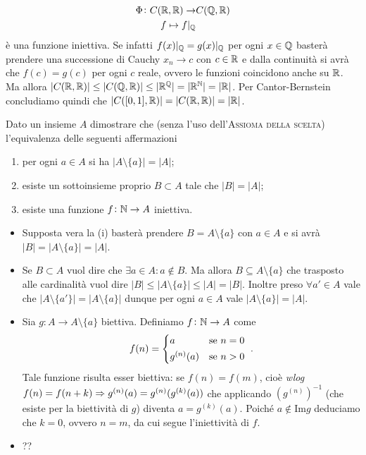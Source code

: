 \begin{enumerate}
  \begin{align*}
    \Phi \colon C(\mathbb{R}, \mathbb{R}) \to & C(\mathbb{Q}, \mathbb{R}) \\
    f \mapsto f |_{\mathbb{Q}}
  \end{align*}
  è una funzione iniettiva. Se infatti $ f(x)|_{\mathbb{Q}} = g(x)|_{\mathbb{Q}} $ per ogni $ x \in \mathbb{Q} $ basterà prendere una successione di Cauchy $ x_n \to c $ con $ c \in \mathbb{R} $ e dalla continuità si avrà che $ f(c) = g(c) $ per ogni $ c $ reale, ovvero le funzioni coincidono anche su $ \mathbb{R} $. Ma allora $ |C(\mathbb{R}, \mathbb{R})|\leq |C(\mathbb{Q}, \mathbb{R})| \leq |\mathbb{R}^{\mathbb{Q}}| = |\mathbb{R}^{\mathbb{N}}| = |\mathbb{R}| $. Per Cantor-Bernstein concludiamo quindi che $ |C([0, 1], \mathbb{R})| = |C(\mathbb{R}, \mathbb{R})| = |\mathbb{R}| $.
\end{enumerate}

\begin{es}
  Dato un insieme $ A $ dimostrare che (senza l'uso dell'\textsc{Assioma della scelta}) l'equivalenza delle seguenti affermazioni
  \begin{enumerate}[label=(\roman*)]
  \item per ogni $ a \in A $ si ha $ |A \setminus \{a\}| = |A| $;
  \item esiste un sottoinsieme proprio $ B \subset A $ tale che $ |B| = |A| $;
  \item esiste una funzione $ f \colon \mathbb{N} \to A $ iniettiva.
  \end{enumerate}
\end{es}
\begin{itemize}[label = (i) $ \Rightarrow $ (ii)]
\item Supposta vera la (i) basterà prendere $ B = A \setminus \{a\} $ con $ a \in A $ e si avrà $ |B| = |A \setminus \{a\}| = |A| $.
\end{itemize}
\begin{itemize}[label = (ii) $ \Rightarrow $ (i)]
\item Se $ B \subset A $ vuol dire che $ \exists a \in A : a \notin B $. Ma allora $ B \subseteq A \setminus \{a\} $ che trasposto alle cardinalità vuol dire $ |B| \leq |A \setminus \{a\}| \leq |A| = |B| $. Inoltre preso $ \forall a' \in A $ vale che $ |A \setminus \{a'\}| = |A \setminus \{a\}| $ dunque per ogni $ a \in A $ vale $ |A \setminus \{a\}| = |A| $.
\end{itemize}
\begin{itemize}[label = (i) $ \Rightarrow $ (iii)]
\item Sia $ g \colon A \to A \setminus \{a\} $ biettiva. Definiamo $ f \colon \mathbb{N} \to A $ come
  \[f(n) =
    \begin{cases*}
      a & \text{se $ n = 0 $} \\
      g^{(n)}(a) & \text{se $ n > 0 $}
    \end{cases*}.\]
  Tale funzione risulta esser biettiva: se $ f(n) = f(m) $, cioè \emph{wlog} $ f(n) = f(n + k) \Rightarrow \linebreak g^{(n)}(a) = g^{(n)}(g^{(k)}(a)) $ che applicando $ \left(g^{(n)}\right)^{-1} $ (che esiste per la biettività di $ g $) diventa $ a = g^{(k)}(a) $. Poiché $ a \notin \mathrm{Im}g $ deduciamo che $ k = 0 $, ovvero $ n = m $, da cui segue l'iniettività di $ f $.
\end{itemize}
\begin{itemize}[label = (iii) $ \Rightarrow $ (i)]
\item ??
\end{itemize}